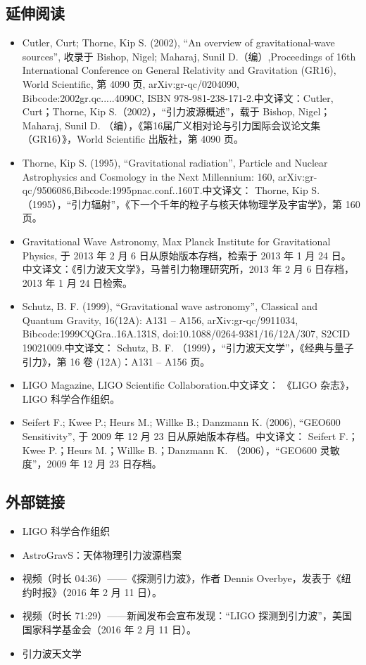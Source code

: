 \subsection{延伸阅读}
\begin{itemize}
\item Cutler, Curt; Thorne, Kip S. (2002), ``An overview of gravitational-wave sources'', 收录于 Bishop, Nigel; Maharaj, Sunil D.（编）,Proceedings of 16th International Conference on General Relativity and Gravitation (GR16), World Scientific, 第 4090 页, arXiv:gr-qc/0204090, Bibcode:2002gr.qc.....4090C, ISBN 978-981-238-171-2.中文译文：Cutler, Curt；Thorne, Kip S.（2002），“引力波源概述”，载于 Bishop, Nigel；Maharaj, Sunil D. （编），《第16届广义相对论与引力国际会议论文集（GR16）》，World Scientific 出版社，第 4090 页。
\item Thorne, Kip S. (1995), ``Gravitational radiation'', Particle and Nuclear Astrophysics and Cosmology in the Next Millennium: 160, arXiv:gr-qc/9506086,Bibcode:1995pnac.conf..160T.中文译文： Thorne, Kip S. （1995），“引力辐射”，《下一个千年的粒子与核天体物理学及宇宙学》，第 160 页。
\item Gravitational Wave Astronomy, Max Planck Institute for Gravitational Physics, 于 2013 年 2 月 6 日从原始版本存档，检索于 2013 年 1 月 24 日。中文译文：《引力波天文学》，马普引力物理研究所，2013 年 2 月 6 日存档，2013 年 1 月 24 日检索。
\item Schutz, B. F. (1999), ``Gravitational wave astronomy'', Classical and Quantum Gravity, 16(12A): A131 – A156, arXiv:gr-qc/9911034, Bibcode:1999CQGra..16A.131S, doi:10.1088/0264-9381/16/12A/307, S2CID 19021009.中文译文： Schutz, B. F. （1999），“引力波天文学”，《经典与量子引力》，第 16 卷 (12A)：A131 – A156 页。
\item LIGO Magazine, LIGO Scientific Collaboration.中文译文： 《LIGO 杂志》，LIGO 科学合作组织。
\item Seifert F.; Kwee P.; Heurs M.; Willke B.; Danzmann K. (2006), ``GEO600 Sensitivity'', 于 2009 年 12 月 23 日从原始版本存档。中文译文： Seifert F.；Kwee P.；Heurs M.；Willke B.；Danzmann K. （2006），“GEO600 灵敏度”，2009 年 12 月 23 日存档。
\end{itemize}
\subsection{外部链接}
\begin{itemize}
\item LIGO 科学合作组织
\item AstroGravS：天体物理引力波源档案
\item 视频（时长 04:36）——《探测引力波》，作者 Dennis Overbye，发表于《纽约时报》（2016 年 2 月 11 日）。
\item 视频（时长 71:29）——新闻发布会宣布发现：“LIGO 探测到引力波”，美国国家科学基金会（2016 年 2 月 11 日）。
\item 引力波天文学
\end{itemize}
